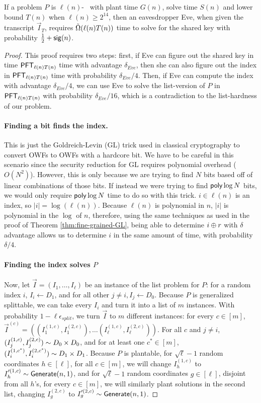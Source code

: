 \begin{lemma}\label{lem:eve-time}
	If a problem $P$ is $\ell(n)$-\keyER~ with plant time $G(n)$, solve time $S(n)$ and lower bound $T(n)$ when $\ell(n)\ge 2^{14}$,
	then an eavesdropper Eve, when given the transcript $\vec I_T$, requires $\~\Omega(\ell(n) T(n))$ time to solve for the shared key with probability $\frac{1}{2}+\sig(n)$.
\end{lemma}
\begin{proof}
	This proof requires two steps: first, if Eve can figure out the shared key in time $\PFT{\ell(n)T(n)}$ time with advantage $\delta_{Eve}$, then she can also figure out the index in $\PFT{\ell(n)T(n)}$ time with probability $\delta_{Eve}/4$. Then, if Eve can compute the index with advantage $\delta_{Eve}/4$, we can use Eve to solve the list-version of $P$ in $\PFT{\ell(n)T(n)}$ with probability $\delta_{Eve}/16$, which is a contradiction to the list-hardness of our problem.
	
	\paragraph{Finding a bit finds the index.} This is just the Goldreich-Levin (GL) trick used in classical cryptography to convert OWFs to OWFs with a hardcore bit. We have to be careful in this scenario since the security reduction for GL requires polynomial overhead ($O(N^2)$). However, this is only because we are trying to find $N$ bits based off of linear combinations of those bits. If instead we were trying to find $\poly \log N$ bits, we would only require $\poly\log N$ time to do so with this trick. $i \in \ell(n)$ is an index, so $|i| = \log(\ell(n))$. Because $\ell(n)$ is polynomial in $n$, $|i|$ is polynomial in the $\log$ of $n$, therefore, using the same techniques as used in the proof of Theorem \ref{thm:fine-grained-GL}, being able to determine $i \xor r$ with $\delta$ advantage allows us to determine $i$ in the same amount of time, with probability $\delta/4$.
	
	\paragraph{Finding the index solves $P$} Now, let $\vec I = ( I_1, \ldots, I_\ell )$ be an instance of the list problem for $P$: for a random index $i$, $I_i \gets D_1$, and for all other $j \neq i, I_j \gets D_0$.
	Because $P$ is generalized splittable, we can take every $I_i$ and turn it into a list of $m$ instances. With probability $1 - \ell \epsilon_{split}$, we turn $\vec I$ to $m$ different instances: for every $c \in [m]$, $\vec I^{(c)} = ( (I_1^{(1,c)}, I_1^{(2,c)}), \ldots  (I_\ell^{(1,c)}, I_\ell^{(2, c)} ))$.
	For all $c$ and $j \neq i$, $(I_j^{(1, c)}, I_j^{(2,c)}) \sim D_0 \x D_0$, and for at least one $c^* \in [m]$, $( I_i^{(1, c^*)}, I_i^{(2,c^*)} ) \sim D_1 \x D_1$. Because $P$ is plantable, for $\sqrt \ell - 1$ random coordinates $h \in [\ell]$, for all $c \in [m]$, we will change $I_h^{(1, c)}$ to $I_h'^{(1, c)} \sim \Generate(n,1)$, and for $\sqrt \ell - 1$ random coordinates $g \in [\ell]$, disjoint from all $h$'s, for every $c \in [m]$, we will similarly plant solutions in the second list, changing $I_g^{(2, c)}$ to $I_g'^{(2, c)} \sim \Generate(n,1)$.
	

\end{proof}
